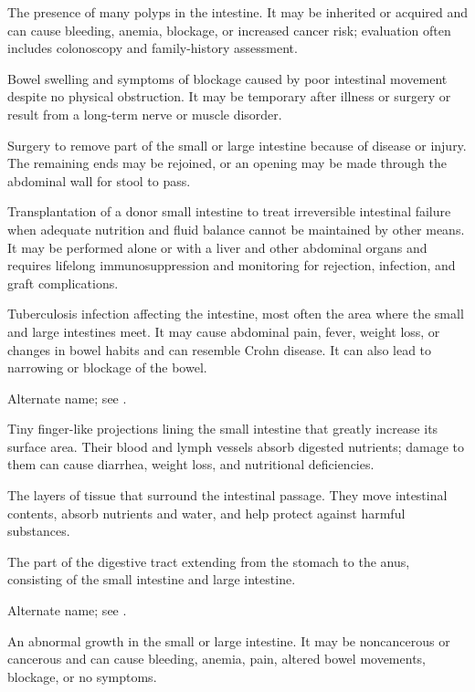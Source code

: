  The presence of many polyps in the intestine. It may be inherited or acquired and can cause bleeding, anemia, blockage, or increased cancer risk; evaluation often includes colonoscopy and family-history assessment.

 Bowel swelling and symptoms of blockage caused by poor intestinal movement despite no physical obstruction. It may be temporary after illness or surgery or result from a long-term nerve or muscle disorder.

 Surgery to remove part of the small or large intestine because of disease or injury. The remaining ends may be rejoined, or an opening may be made through the abdominal wall for stool to pass.

 Transplantation of a donor small intestine to treat irreversible intestinal failure when adequate nutrition and fluid balance cannot be maintained by other means. It may be performed alone or with a liver and other abdominal organs and requires lifelong immunosuppression and monitoring for rejection, infection, and graft complications.

 Tuberculosis infection affecting the
  intestine, most often the area where the small and large intestines
  meet. It may cause abdominal pain, fever, weight loss, or changes in
  bowel habits and can resemble Crohn disease. It can also lead to
  narrowing or blockage of the bowel.

 Alternate name; see .

 Tiny finger-like projections lining the small intestine that greatly increase its surface area. Their blood and lymph vessels absorb digested nutrients; damage to them can cause diarrhea, weight loss, and nutritional deficiencies.

 The layers of tissue that surround the intestinal passage. They move intestinal contents, absorb nutrients and water, and help protect against harmful substances.

 The part of the digestive tract extending from the stomach to the anus, consisting of the small intestine and large intestine.

 Alternate name; see .

 An abnormal growth in the small or large intestine. It may be noncancerous or cancerous and can cause bleeding, anemia, pain, altered bowel movements, blockage, or no symptoms.

